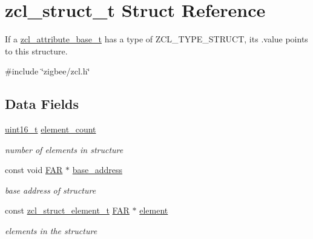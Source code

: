\hypertarget{structzcl__struct__t}{\section{zcl\-\_\-struct\-\_\-t Struct Reference}
\label{structzcl__struct__t}
}


If a \hyperlink{structzcl__attribute__base__t}{zcl\-\_\-attribute\-\_\-base\-\_\-t} has a type of Z\-C\-L\-\_\-\-T\-Y\-P\-E\-\_\-\-S\-T\-R\-U\-C\-T, its .value points to this structure.  




{\ttfamily \#include \char`\"{}zigbee/zcl.\-h\char`\"{}}

\subsection*{Data Fields}
\begin{DoxyCompactItemize}
\item 
\hypertarget{group__zcl_gadb910d838105c452018c676e15202224}{\hyperlink{group__hal_ga5a8b2dc9e45a9ee81a94ef304fb62505}{uint16\-\_\-t} \hyperlink{group__zcl_gadb910d838105c452018c676e15202224}{element\-\_\-count}}\label{group__zcl_gadb910d838105c452018c676e15202224}

\begin{DoxyCompactList}\small\item\em number of elements in structure \end{DoxyCompactList}\item 
\hypertarget{group__zcl_ga2c4fcaeccedd1b62207f9bb03a26fdf1}{const void \hyperlink{group__hal_gaef060b3456fdcc093a7210a762d5f2ed}{F\-A\-R} $\ast$ \hyperlink{group__zcl_ga2c4fcaeccedd1b62207f9bb03a26fdf1}{base\-\_\-address}}\label{group__zcl_ga2c4fcaeccedd1b62207f9bb03a26fdf1}

\begin{DoxyCompactList}\small\item\em base address of structure \end{DoxyCompactList}\item 
\hypertarget{group__zcl_gacfb513b58d4138fe737df9448fb52e5a}{const \hyperlink{structzcl__struct__element__t}{zcl\-\_\-struct\-\_\-element\-\_\-t} \hyperlink{group__hal_gaef060b3456fdcc093a7210a762d5f2ed}{F\-A\-R} $\ast$ \hyperlink{group__zcl_gacfb513b58d4138fe737df9448fb52e5a}{element}}\label{group__zcl_gacfb513b58d4138fe737df9448fb52e5a}

\begin{DoxyCompactList}\small\item\em elements in the structure \end{DoxyCompactList}\end{DoxyCompactItemize}


